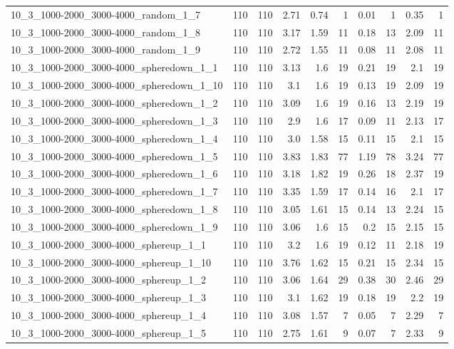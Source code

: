 \begin{center}
\begin{scriptsize}
\begin{longtable}{lrrrrrrrrr}
10\_3\_1000-2000\_3000-4000\_random\_1\_7 & 110 & 110 & 2.71 & 0.74 & 1 & 0.01 & 1 & 0.35 & 1\\
10\_3\_1000-2000\_3000-4000\_random\_1\_8 & 110 & 110 & 3.17 & 1.59 & 11 & 0.18 & 13 & 2.09 & 11\\
10\_3\_1000-2000\_3000-4000\_random\_1\_9 & 110 & 110 & 2.72 & 1.55 & 11 & 0.08 & 11 & 2.08 & 11\\
10\_3\_1000-2000\_3000-4000\_spheredown\_1\_1 & 110 & 110 & 3.13 & 1.6 & 19 & 0.21 & 19 & 2.1 & 19\\
10\_3\_1000-2000\_3000-4000\_spheredown\_1\_10 & 110 & 110 & 3.1 & 1.6 & 19 & 0.13 & 19 & 2.09 & 19\\
10\_3\_1000-2000\_3000-4000\_spheredown\_1\_2 & 110 & 110 & 3.09 & 1.6 & 19 & 0.16 & 13 & 2.19 & 19\\
10\_3\_1000-2000\_3000-4000\_spheredown\_1\_3 & 110 & 110 & 2.9 & 1.6 & 17 & 0.09 & 11 & 2.13 & 17\\
10\_3\_1000-2000\_3000-4000\_spheredown\_1\_4 & 110 & 110 & 3.0 & 1.58 & 15 & 0.11 & 15 & 2.1 & 15\\
10\_3\_1000-2000\_3000-4000\_spheredown\_1\_5 & 110 & 110 & 3.83 & 1.83 & 77 & 1.19 & 78 & 3.24 & 77\\
10\_3\_1000-2000\_3000-4000\_spheredown\_1\_6 & 110 & 110 & 3.18 & 1.82 & 19 & 0.26 & 18 & 2.37 & 19\\
10\_3\_1000-2000\_3000-4000\_spheredown\_1\_7 & 110 & 110 & 3.35 & 1.59 & 17 & 0.14 & 16 & 2.1 & 17\\
10\_3\_1000-2000\_3000-4000\_spheredown\_1\_8 & 110 & 110 & 3.05 & 1.61 & 15 & 0.14 & 13 & 2.24 & 15\\
10\_3\_1000-2000\_3000-4000\_spheredown\_1\_9 & 110 & 110 & 3.06 & 1.6 & 15 & 0.2 & 15 & 2.15 & 15\\
10\_3\_1000-2000\_3000-4000\_sphereup\_1\_1 & 110 & 110 & 3.2 & 1.6 & 19 & 0.12 & 11 & 2.18 & 19\\
10\_3\_1000-2000\_3000-4000\_sphereup\_1\_10 & 110 & 110 & 3.76 & 1.62 & 15 & 0.21 & 15 & 2.34 & 15\\
10\_3\_1000-2000\_3000-4000\_sphereup\_1\_2 & 110 & 110 & 3.06 & 1.64 & 29 & 0.38 & 30 & 2.46 & 29\\
10\_3\_1000-2000\_3000-4000\_sphereup\_1\_3 & 110 & 110 & 3.1 & 1.62 & 19 & 0.18 & 19 & 2.2 & 19\\
10\_3\_1000-2000\_3000-4000\_sphereup\_1\_4 & 110 & 110 & 3.08 & 1.57 & 7 & 0.05 & 7 & 2.29 & 7\\
10\_3\_1000-2000\_3000-4000\_sphereup\_1\_5 & 110 & 110 & 2.75 & 1.61 & 9 & 0.07 & 7 & 2.33 & 9\\

\end{longtable}
\end{scriptsize}
\end{center}
